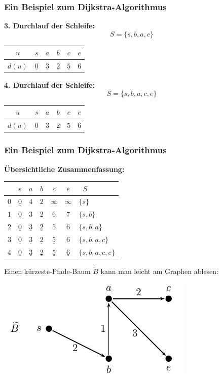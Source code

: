 \documentclass[smaller]{beamer}
\begin{document}
\begin{frame}
\frametitle{Ein Beispiel zum Dijkstra-Algorithmus}
\textbf{3. Durchlauf der Schleife:}
\[
S = \big\{ s,b,a,c \big\}
\]
\begin{center}
\begin{tabular}{c|ccccc}
$u$ & $s$ & $a$ & $b$ & $c$ & $e$ \\ \hline
$d(u)$ & $\underline{0}$ & $\underline{3}$ & $\underline{2}$ & $\underline{5}$ & $6$
\end{tabular}
\end{center}

\textbf{4. Durchlauf der Schleife:}
\[
S = \big\{ s,b,a,c,e \big\}
\]
\begin{center}
\begin{tabular}{c|ccccc}
$u$ & $s$ & $a$ & $b$ & $c$ & $e$ \\ \hline
$d(u)$ & $\underline{0}$ & $\underline{3}$ & $\underline{2}$ & $\underline{5}$ & $\underline{6}$
\end{tabular}
\end{center}
\end{frame}

\begin{frame}
\frametitle{Ein Beispiel zum Dijkstra-Algorithmus}
\textbf{Übersichtliche Zusammenfassung:}
\begin{center}
\begin{tabular}{c||c|c|c|c|c||l}
 & $s$ & $a$ & $b$ & $c$ & $e$ & \ $S$ \\ \hline\hline
$0$ & $\underline{0}$ & $4$ & $2$ & $\infty$ & $\infty$ & $\bigl\{ s \bigr\}$ \\ \hline
$1$ & $\underline{0}$ & $3$ & $\underline{2}$ & $6$ & $7$ & $\bigl\{ s,b \bigr\}$ \\ \hline
$2$ & $\underline{0}$ & $\underline{3}$ & $\underline{2}$ & $5$ & $6$ & $\bigl\{ s,b,a \bigr\}$ \\ \hline
$3$ & $\underline{0}$ & $\underline{3}$ & $\underline{2}$ & $\underline{5}$ & $6$ & $\bigl\{ s,b,a,c \bigr\}$ \\ \hline
$4$ & $\underline{0}$ & $\underline{3}$ & $\underline{2}$ & $\underline{5}$ & $\underline{6}$ & $\bigl\{ s,b,a,c,e \bigr\}$
\end{tabular}
\end{center}

Einen kürzeste-Pfade-Baum $\widetilde{B}$ kann man leicht am Graphen ablesen:

\begin{center}
 \includegraphics{fig81.pdf}
\end{center}
\end{frame}
\end{document}
